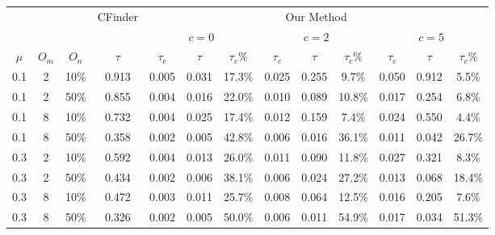 \begin{table}
\begin{tabular}{ c c c || c | c c c | c c c | c c c }
\toprule\toprule
 	&  		& 		&	CFinder	&			\multicolumn{9}{c}{Our Method}			\\
 	&  		& 		&			&			\multicolumn{3}{c}{$c=0$}				&		\multicolumn{3}{c}{$c=2$}	&	\multicolumn{3}{c}{$c=5$}				\\
\hline
$\mu$&$O_m$	&$O_n$	&	$\tau$	&	$\tau_c$	&	$\tau$	&$\tau_c\%$	&	$\tau_c$	&	$\tau$	&$\tau_c\%$	&	$\tau_c$	&	$\tau$	&$\tau_c\%$	\\
\hline\hline
0.1	&	2	&	10\%	&	0.913	&	0.005	&	0.031	&	17.3\%	&	0.025	&	0.255	&	9.7\%	&	0.050	&	0.912	&	5.5\%	\\
0.1	&	2	&	50\%	&	0.855	&	0.004	&	0.016	&	22.0\%	&	0.010	&	0.089	&	10.8\%	&	0.017	&	0.254	&	6.8\%	\\
0.1	&	8	&	10\%	&	0.732	&	0.004	&	0.025	&	17.4\%	&	0.012	&	0.159	&	7.4\%	&	0.024	&	0.550	&	4.4\%	\\
0.1	&	8	&	50\%	&	0.358	&	0.002	&	0.005	&	42.8\%	&	0.006	&	0.016	&	36.1\%	&	0.011	&	0.042	&	26.7\%	\\
0.3	&	2	&	10\%	&	0.592	&	0.004	&	0.013	&	26.0\%	&	0.011	&	0.090	&	11.8\%	&	0.027	&	0.321	&	8.3\%	\\
0.3	&	2	&	50\%	&	0.434	&	0.002	&	0.006	&	38.1\%	&	0.006	&	0.024	&	27.2\%	&	0.013	&	0.068	&	18.4\%	\\
0.3	&	8	&	10\%	&	0.472	&	0.003	&	0.011	&	25.7\%	&	0.008	&	0.064	&	12.5\%	&	0.016	&	0.205	&	7.6\%	\\
0.3	&	8	&	50\%	&	0.326	&	0.002	&	0.005	&	50.0\%	&	0.006	&	0.011	&	54.9\%	&	0.017	&	0.034	&	51.3\%	\\\bottomrule\bottomrule
\end{tabular}

\end{table}
